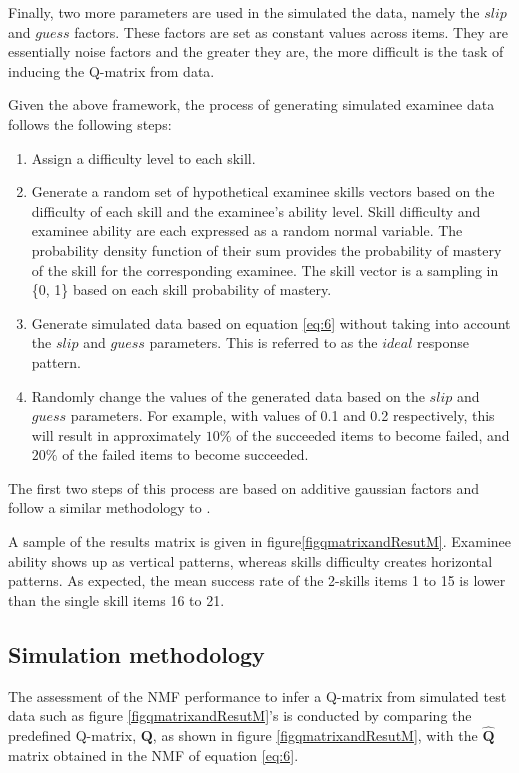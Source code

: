 Finally, two more parameters are used in the simulated the data, namely the $\mathit{slip}$ and $\mathit{guess}$ factors. These factors are set as constant values across items. They are essentially noise factors and the greater they are, the more difficult is the task of inducing the Q-matrix from data.

Given the above framework, the process of generating simulated examinee data follows the following steps:
\begin{enumerate}
\item Assign a difficulty level to each skill.
\item Generate a random set of hypothetical examinee skills vectors based on the difficulty of each skill and the examinee\textquoteright{}s ability level. Skill difficulty and examinee ability are each expressed as a random normal variable. The probability density function of their sum provides the probability of mastery of the skill for the corresponding examinee. The skill vector is a sampling in \{0, 1\} based on each skill probability of mastery. 
\item Generate simulated data based on equation \ref{eq:6} without taking into account the $\mathit{slip}$ and $\mathit{guess}$ parameters. This is referred to as the $ideal$ response pattern.
\item Randomly change the values of the generated data based on the $\mathit{slip}$ and $\mathit{guess}$ parameters. For example, with values of 0.1 and 0.2 respectively, this will result in approximately $10\%$ of the succeeded items to become failed, and $20\%$ of the failed items to become succeeded.
\end{enumerate}
The first two steps of this process are based on additive gaussian factors and follow a similar methodology to \citep{desmarais2011conditions}.

A sample of the results matrix is given in figure\ref{figqmatrixandResutM}. Examinee ability shows up as vertical patterns, whereas skills difficulty creates horizontal patterns. As expected, the mean success rate of the 2-skills items 1 to 15 is lower than the single skill items 16 to 21.



\subsection{Simulation methodology}


The assessment of the NMF performance to infer a Q-matrix from simulated test data such as figure \ref{figqmatrixandResutM}'s is conducted by comparing the predefined Q-matrix, $\mathbf{Q}$, as shown in figure \ref{figqmatrixandResutM}, with the $\hat{\mathbf{Q}}$ matrix obtained in the NMF of equation \ref{eq:6}.

